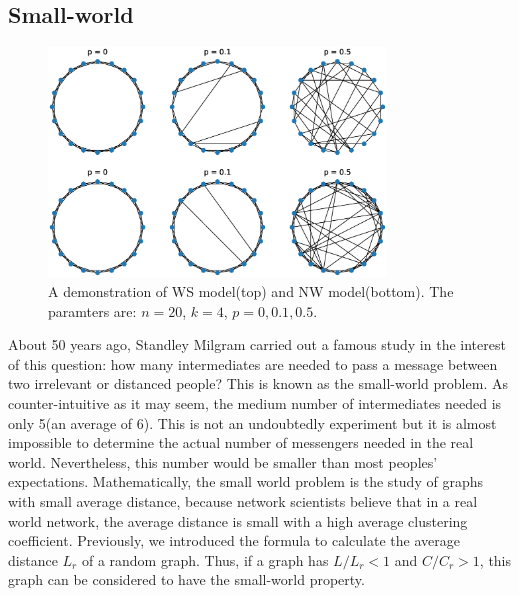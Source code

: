 \documentclass[12pt]{article}
\begin{document}
\subsection{Small-world}
\label{small_world}

\begin{figure}[h]
    \includegraphics[width = 0.8\textwidth]{small_world_network_model.eps}
    \centering
    \caption{A demonstration of WS model(top) and NW model(bottom). The paramters are: $n=20$, $k=4$, $p=0,0.1,0.5$.}
    \label{fig:small_world_models}
\end{figure}
About 50 years ago, Standley Milgram\cite{milgram1967small} carried out a famous study in the interest of this question: how many intermediates are needed to pass a message between two irrelevant or distanced people? This is known as the small-world problem. As counter-intuitive as it may seem, the medium number of intermediates needed is only 5(an average of 6)\cite{milgram1967small}. This is not an undoubtedly experiment but it is almost impossible to determine the actual number of messengers needed in the real world. Nevertheless, this number would be smaller than most peoples' expectations. Mathematically, the small world problem is the study of graphs with small average distance, because network scientists believe that in a real world network, the average distance is small with a high average clustering coefficient. Previously, we introduced the formula to calculate the average distance $L_r$ of a random graph. Thus, if a graph has $L/L_r <1$ and $C/C_r>1$, this graph can be considered to have the small-world property.\\
\par
\end{document}
